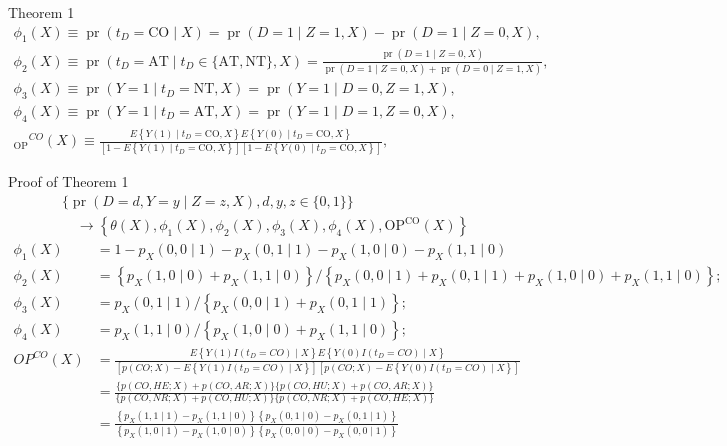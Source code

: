 \documentclass[aspectratio=169,xcolor=dvipsnames]{beamer}
\begin{document}
\begin{frame}{Theorem 1}
$$
\begin{gathered}
\phi_{1}(X) \equiv \operatorname{pr}\left(t_{D}=\mathrm{CO} \mid X\right)=\operatorname{pr}(D=1 \mid Z=1, X)-\operatorname{pr}(D=1 \mid Z=0, X), \\
\phi_{2}(X) \equiv \operatorname{pr}\left(t_{D}=\mathrm{AT} \mid t_{D} \in\{\mathrm{AT}, \mathrm{NT}\}, X\right)=\frac{\operatorname{pr}(D=1 \mid Z=0, X)}{\operatorname{pr}(D=1 \mid Z=0, X)+\operatorname{pr}(D=0 \mid Z=1, X)}, \\
\phi_{3}(X) \equiv \operatorname{pr}\left(Y=1 \mid t_{D}=\mathrm{NT}, X\right)=\operatorname{pr}(Y=1 \mid D=0, Z=1, X), \\
\phi_{4}(X) \equiv \operatorname{pr}\left(Y=1 \mid t_{D}=\mathrm{AT}, X\right)=\operatorname{pr}(Y=1 \mid D=1, Z=0, X), \\
{ }_{\mathrm{OP}}{ }^{C O}(X) \equiv \frac{E\left\{Y(1) \mid t_{D}=\mathrm{CO}, X\right\} E\left\{Y(0) \mid t_{D}=\mathrm{CO}, X\right\}}{\left[1-E\left\{Y(1) \mid t_{D}=\mathrm{CO}, X\right\}\right]\left[1-E\left\{Y(0) \mid t_{D}=\mathrm{CO}, X\right\}\right]},
\end{gathered}
$$
\end{frame}

\begin{frame}{Proof of Theorem 1}
$$
\begin{aligned}
&\{\operatorname{pr}(D=d, Y=y \mid Z=z, X), d, y, z \in\{0,1\}\} \\
&\quad \rightarrow\left\{\theta(X), \phi_{1}(X), \phi_{2}(X), \phi_{3}(X), \phi_{4}(X), \mathrm{OP}^{\mathrm{CO}}(X)\right\}
\end{aligned}
$$ 
$$
\begin{aligned}
\phi_{1}(X)&=1-p_{X}(0,0 \mid 1)-p_{X}(0,1 \mid 1)-p_{X}(1,0 \mid 0)-p_{X}(1,1 \mid 0)\\
\phi_{2}(X) &=\left\{p_{X}(1,0 \mid 0)+p_{X}(1,1 \mid 0)\right\} /\left\{p_{X}(0,0 \mid 1)+p_{X}(0,1 \mid 1)+p_{X}(1,0 \mid 0)+p_{X}(1,1 \mid 0)\right\};\\
\phi_{3}(X) &=p_{X}(0,1 \mid 1) /\left\{p_{X}(0,0 \mid 1)+p_{X}(0,1 \mid 1)\right\} ; \\
\phi_{4}(X) &=p_{X}(1,1 \mid 0) /\left\{p_{X}(1,0 \mid 0)+p_{X}(1,1 \mid 0)\right\} ; \\
O P^{C O}(X) &=\frac{E\left\{Y(1) I\left(t_{D}=C O\right) \mid X\right\} E\left\{Y(0) I\left(t_{D}=C O\right) \mid X\right\}}{\left[p(C O ; X)-E\left\{Y(1) I\left(t_{D}=C O\right) \mid X\right\}\right]\left[p(C O ; X)-E\left\{Y(0) I\left(t_{D}=C O\right) \mid X\right\}\right]} \\
&=\frac{\{p(C O, H E ; X)+p(C O, A R ; X)\}\{p(C O, H U ; X)+p(C O, A R ; X)\}}{\{p(C O, N R ; X)+p(C O, H U ; X)\}\{p(C O, N R ; X)+p(C O, H E ; X)\}} \\
&=\frac{\left\{p_{X}(1,1 \mid 1)-p_{X}(1,1 \mid 0)\right\}\left\{p_{X}(0,1 \mid 0)-p_{X}(0,1 \mid 1)\right\}}{\left\{p_{X}(1,0 \mid 1)-p_{X}(1,0 \mid 0)\right\}\left\{p_{X}(0,0 \mid 0)-p_{X}(0,0 \mid 1)\right\}}
\end{aligned}
$$
\end{frame}
\end{document}
